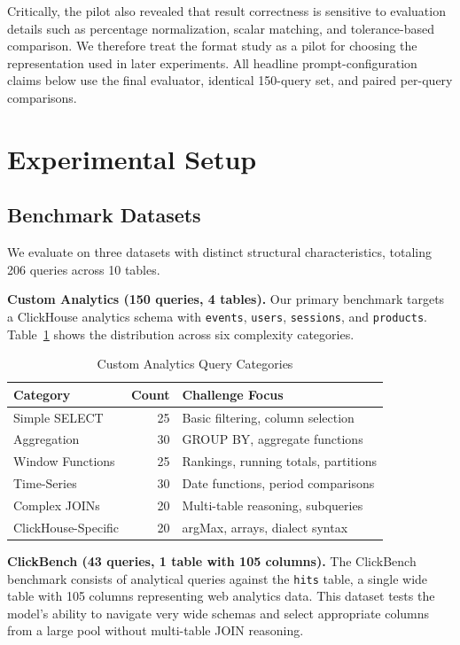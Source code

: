 \documentclass[sigconf, nonacm]{acmart}
\begin{document}
Critically, the pilot also revealed that result correctness is sensitive to evaluation details such as percentage normalization, scalar matching, and tolerance-based comparison. We therefore treat the format study as a pilot for choosing the representation used in later experiments. All headline prompt-configuration claims below use the final evaluator, identical 150-query set, and paired per-query comparisons.

\section{Experimental Setup}
\label{sec:setup}

\subsection{Benchmark Datasets}
We evaluate on three datasets with distinct structural characteristics, totaling 206 queries across 10 tables.

\textbf{Custom Analytics (150 queries, 4 tables).} Our primary benchmark targets a ClickHouse analytics schema with \texttt{events}, \texttt{users}, \texttt{sessions}, and \texttt{products}. Table~\ref{tab:categories} shows the distribution across six complexity categories.

\begin{table}[t]
\caption{Custom Analytics Query Categories}
\label{tab:categories}
\centering
\small
\begin{tabular}{lrl}
\toprule
\textbf{Category} & \textbf{Count} & \textbf{Challenge Focus} \\
\midrule
Simple SELECT & 25 & Basic filtering, column selection \\
Aggregation & 30 & GROUP BY, aggregate functions \\
Window Functions & 25 & Rankings, running totals, partitions \\
Time-Series & 30 & Date functions, period comparisons \\
Complex JOINs & 20 & Multi-table reasoning, subqueries \\
ClickHouse-Specific & 20 & argMax, arrays, dialect syntax \\
\bottomrule
\end{tabular}
\end{table}

\textbf{ClickBench (43 queries, 1 table with 105 columns).} The ClickBench~\cite{clickbench2023} benchmark consists of analytical queries against the \texttt{hits} table, a single wide table with 105 columns representing web analytics data. This dataset tests the model's ability to navigate very wide schemas and select appropriate columns from a large pool without multi-table JOIN reasoning.
\end{document}
